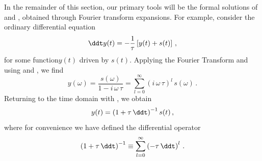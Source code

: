 In the remainder of this section, our primary tools will be the formal solutions of  and , obtained through Fourier transform expansions. For example, consider the ordinary differential equation
 \begin{equation}
\ddt y(t) = -\frac{1}{\tau} \left[y(t) + s(t)\right]\, ,
 \end{equation}
for some function$y(t)$ driven by $s(t)$. Applying the Fourier Transform and using  and , we find
 \begin{equation}
y(\omega) = \frac{s(\omega)}{1 - i\, \omega\, \tau} = \sum_{l = 0}^{\infty} (i\, \omega\, \tau)^l\, s(\omega)\, .
 \end{equation}
Returning to the time domain with , we obtain
 \begin{equation}
y(t) = \left(1 + \tau\, \ddt\right)^{-1} s(t)\, ,
 \end{equation}
where for convenience we have defined the differential operator
 \begin{equation} \label{eqn:mfl_diff_oper}
\left(1 + \tau\, \ddt\right)^{-1} \equiv \sum_{l = 0}^{\infty} \left( -\tau\, \ddt \right)^l \, .
 \end{equation}

